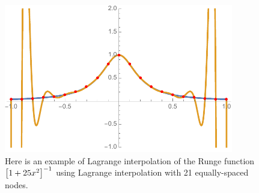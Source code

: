 \begin{figure}[t]
\centering
\includegraphics[width=10cm]{plots/runge_phenomenon.pdf}
\caption[Runge phenomenon]{
Here is an example of Lagrange interpolation of the Runge function
$\left[ 1+25x^{2} \right]^{-1}$ using Lagrange interpolation
with 21 equally-spaced nodes.}
\label{fig:intro_runge_plot}
\end{figure}
